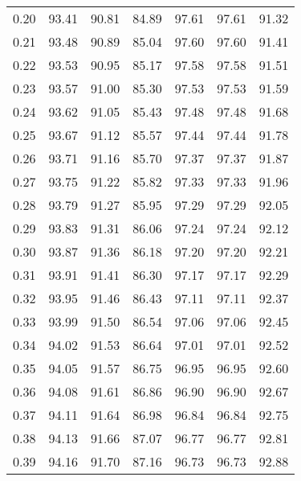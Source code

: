 \begin{tabular}{|c|c|c|c|c|c|c|}
      0.20 &     93.41 &     90.81 &      84.89 &   97.61 &      97.61 &         91.32 \\
      0.21 &     93.48 &     90.89 &      85.04 &   97.60 &      97.60 &         91.41 \\
      0.22 &     93.53 &     90.95 &      85.17 &   97.58 &      97.58 &         91.51 \\
      0.23 &     93.57 &     91.00 &      85.30 &   97.53 &      97.53 &         91.59 \\
      0.24 &     93.62 &     91.05 &      85.43 &   97.48 &      97.48 &         91.68 \\
      0.25 &     93.67 &     91.12 &      85.57 &   97.44 &      97.44 &         91.78 \\
      0.26 &     93.71 &     91.16 &      85.70 &   97.37 &      97.37 &         91.87 \\
      0.27 &     93.75 &     91.22 &      85.82 &   97.33 &      97.33 &         91.96 \\
      0.28 &     93.79 &     91.27 &      85.95 &   97.29 &      97.29 &         92.05 \\
      0.29 &     93.83 &     91.31 &      86.06 &   97.24 &      97.24 &         92.12 \\
      0.30 &     93.87 &     91.36 &      86.18 &   97.20 &      97.20 &         92.21 \\
      0.31 &     93.91 &     91.41 &      86.30 &   97.17 &      97.17 &         92.29 \\
      0.32 &     93.95 &     91.46 &      86.43 &   97.11 &      97.11 &         92.37 \\
      0.33 &     93.99 &     91.50 &      86.54 &   97.06 &      97.06 &         92.45 \\
      0.34 &     94.02 &     91.53 &      86.64 &   97.01 &      97.01 &         92.52 \\
      0.35 &     94.05 &     91.57 &      86.75 &   96.95 &      96.95 &         92.60 \\
      0.36 &     94.08 &     91.61 &      86.86 &   96.90 &      96.90 &         92.67 \\
      0.37 &     94.11 &     91.64 &      86.98 &   96.84 &      96.84 &         92.75 \\
      0.38 &     94.13 &     91.66 &      87.07 &   96.77 &      96.77 &         92.81 \\
      0.39 &     94.16 &     91.70 &      87.16 &   96.73 &      96.73 &         92.88 \\

\end{tabular}
